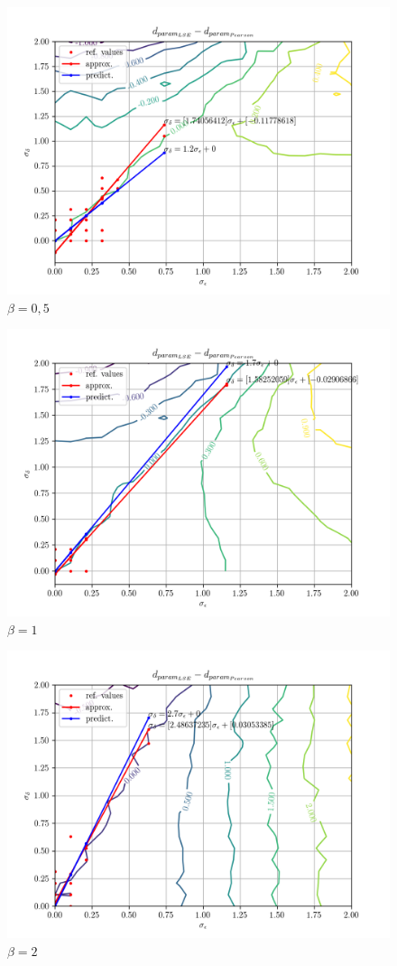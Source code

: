 \documentclass[a4paper,landscape,hidelinks,14pt]{extarticle}
\begin{document}
\begin{figure}[h!]
  \centering
  \includegraphics[width=.8\linewidth]{fig/beta-0,5_param-accs-diff-approx.png}
  \caption{$ \beta = 0{,}5 $}
\end{figure}

\begin{figure}[h!]
  \centering
  \includegraphics[width=.8\linewidth]{fig/beta-1_param-accs-diff-approx.png}
  \caption{$ \beta = 1 $}
\end{figure}

\begin{figure}[h!]
  \centering
  \includegraphics[width=.8\linewidth]{fig/beta-2_param-accs-diff-approx.png}
  \caption{$ \beta = 2 $}
\end{figure}
\end{document}

